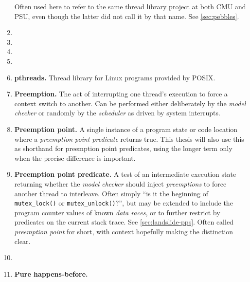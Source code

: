 \begin{enumerate}
		Often used here to refer to the same thread library project at both CMU and PSU,
		even though the latter did not call it by that name.
		See \cref{sec:pebbles}.
	\item {}
	\item {}
	\item {}
	\item {}
	\item {\bf pthreads.}
		Thread library for Linux programs provided by POSIX.
	\item {\bf Preemption.}
		The act of interrupting one thread's execution to force a context switch to another.
		Can be performed either deliberately by the {\em model checker}
		or randomly by the {\em scheduler} as driven by system interrupts.
	\item {\bf Preemption point.}
		A single instance of a program state or code location where a {\em preemption point predicate} returns true.
		This thesis will also use this as shorthand for preemption point predicates,
		using the longer term only when the precise difference is important.
	\item {\bf Preemption point predicate.}
		A test of an intermediate execution state returning whether the {\em model checker}
		should inject {\em preemptions} to force another thread to interleave.
		Often simply ``is it the beginning of {\tt mutex\_lock()} or {\tt mutex\_unlock()}?'',
		but may be extended to include the program counter values of known {\em data races},
		or to further restrict by predicates on the current stack trace.
		See \cref{sec:landslide-pps}.
		Often called {\em preemption point} for short, with context hopefully making the distinction clear.
	\item {}
	\item {\bf Pure happens-before.}

\end{enumerate}
